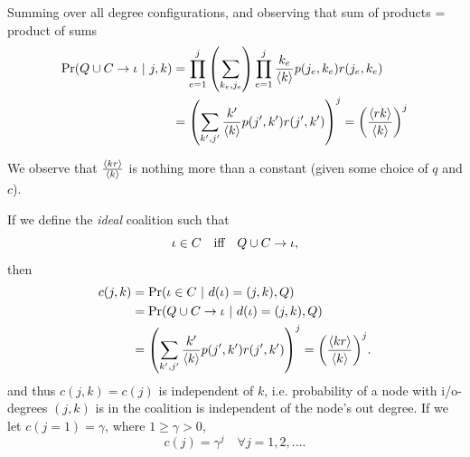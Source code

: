 \documentclass[10pt]{beamer}
\begin{document}
\begin{frame}
Summing over all degree configurations, and observing that sum of products = product of sums
\begin{align}
\Pr(Q\cup C \to \iota \ \lvert \ j,k) &= \prod_{e=1}^j\qty(\sum_{k_e,j_e})\prod_{e=1}^j\frac{k_e}{\expval{k}} p(j_e, k_e)r(j_e, k_e) \\
&= \qty(\sum_{k',j'}\frac{k'}{\expval{k}} p(j', k')r(j', k'))^j = \qty(\frac{\expval{rk}}{\expval{k}})^j
\end{align}

We observe that $\frac{\expval{kr}}{\expval{k}}$ is nothing more than a constant (given some choice of $q$ and $c$).
\end{frame}

\begin{frame}
If we define the \emph{ideal} coalition such that
\begin{equation}
\iota \in C \qq{iff} Q \cup C \to \iota,
\end{equation}
then
\begin{align}
c(j,k) &= \Pr(\iota \in C \ \lvert \ d(\iota) = (j,k), Q)\\
 &=  \Pr(Q \cup C \to \iota \ \lvert \ d(\iota) = (j,k), Q) \\
 &= \qty(\sum_{k',j'}\frac{k'}{\expval{k}} p(j', k')r(j', k'))^j = \qty(\frac{\expval{kr}}{\expval{k}})^j.
\end{align}
and thus $c(j,k) = c(j)$ is independent of $k$, i.e. probability of a node with i/o-degrees $(j,k)$ is in the coalition is independent of the node's out degree. If we let $c(j=1) = \gamma$, where $1 \geq \gamma > 0$,
\begin{equation}
c(j) = \gamma^j \quad \forall j = 1,2, \ldots.
\end{equation}
\end{frame}
\end{document}
